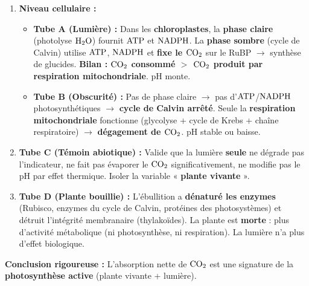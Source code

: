 \documentclass[11pt]{article}
\begin{document}
\begin{exoresolu}
\begin{enumerate}
\begin{itemize}
                \item Tube D : Jaune $\rightarrow$ \textbf{Jaune} = pH \textbf{stable} $\rightarrow$ $\ce{CO2}$ \textbf{stable}.
            \end{itemize}
        \item \textbf{Niveau cellulaire :}
            \begin{itemize}
                \item \textbf{Tube A (Lumière) :} Dans les \textbf{chloroplastes}, la \textbf{phase claire} (photolyse $\ce{H2O}$) fournit $\ce{ATP}$ et $\ce{NADPH}$. La \textbf{phase sombre} (cycle de Calvin) utilise $\ce{ATP}$, $\ce{NADPH}$ et \textbf{fixe le $\ce{CO2}$} sur le RuBP $\rightarrow$ synthèse de glucides. \textbf{Bilan : $\ce{CO2}$ consommé $>$ $\ce{CO2}$ produit par respiration mitochondriale}. pH monte.
                \item \textbf{Tube B (Obscurité) :} Pas de phase claire $\rightarrow$ pas d'$\ce{ATP}$/$\ce{NADPH}$ photosynthétiques $\rightarrow$ \textbf{cycle de Calvin arrêté}. Seule la \textbf{respiration mitochondriale} fonctionne (glycolyse + cycle de Krebs + chaîne respiratoire) $\rightarrow$ \textbf{dégagement de $\ce{CO2}$}. pH stable ou baisse.
            \end{itemize}
        \item \textbf{Tube C (Témoin abiotique) :} Valide que la lumière \textbf{seule} ne dégrade pas l'indicateur, ne fait pas évaporer le $\ce{CO2}$ significativement, ne modifie pas le pH par effet thermique. Isoler la variable « \textbf{plante vivante} ».
        \item \textbf{Tube D (Plante bouillie) :} L'ébullition a \textbf{dénaturé les enzymes} (Rubisco, enzymes du cycle de Calvin, protéines des photosystèmes) et détruit l'intégrité membranaire (thylakoïdes). La plante est \textbf{morte} : plus d'activité métabolique (ni photosynthèse, ni respiration). La lumière n'a plus d'effet biologique.
    \end{enumerate}
    \textbf{Conclusion rigoureuse :} L'absorption nette de $\ce{CO2}$ est une signature de la \textbf{photosynthèse active} (plante vivante + lumière).
\end{exoresolu}
\end{document}
